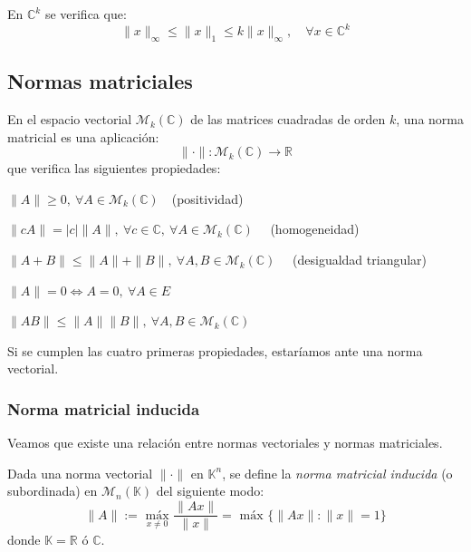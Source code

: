 \begin{ejemplo} En $\mathbb{C}^k$ se verifica que: $$\|x\|_\infty \le \|x\|_1 \le k\|x\|_\infty,\quad \forall x \in \mathbb{C}^k$$

\end{ejemplo}

\subsection{Normas matriciales}
\label{sub:normas_matriciales}

\begin{ndef}
    En el espacio vectorial $\mathcal M_k(\mathbb C)$ de las matrices cuadradas de orden $k$, una norma matricial es una aplicación: $$\|\cdot\| : \mathcal M_k (\mathbb C) \longrightarrow \mathbb R$$ que verifica las siguientes propiedades:
    \begin{nlist}
		\item $\|A\| \ge 0, \ \forall A \in \mathcal M_k(\mathbb{C})\quad$(positividad)
	\item $\|cA\| = |c|\|A\|, \ \forall c \in \mathbb{C},\ \forall A \in \mathcal M_k(\mathbb{C})\quad$ (homogeneidad)
	\item $\|A + B \| \le \|A\| + \|B\|, \ \forall A,B \in \mathcal M_k(\mathbb{C})\quad$ (desigualdad triangular)
	\item $\|A\| = 0 \iff A = 0,\ \forall A \in E$
	\item $\|A B \| \le \|A\| \|B\|, \ \forall A,B \in \mathcal M_k(\mathbb{C})$
\end{nlist}
\end{ndef}
\begin{nota}
	Si se cumplen las cuatro primeras propiedades, estaríamos ante una norma vectorial.
\end{nota}

\subsubsection{Norma matricial inducida}
\label{ssub:norma_matricial_inducida}

Veamos que existe una relación entre normas vectoriales y normas matriciales.

\begin{ndef}
    Dada una norma vectorial $\|\cdot\|$ en $\mathbb{K}^n$, se define la \textit{norma matricial inducida} (o subordinada) en $\mathcal M_n(\mathbb K)$ del siguiente modo: $$\|A\| := \underset{x\ne 0}{\text{ máx }} \frac{\|Ax\|}{\|x\|} = \text{ máx } \{ \|Ax\| : \|x\| = 1 \}$$ donde $\mathbb K = \mathbb{R}$ ó $\mathbb{C}$.
\end{ndef}

